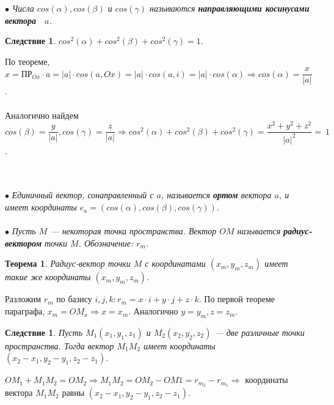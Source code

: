 $\bullet$ \textit{Числа $cos(\alpha), cos(\beta)$ и $cos(\gamma)$ называются \textbf{направляющими косинусами вектора~ $a$}.}
\newtheorem*{cor2_3_2}{Следствие}\begin{cor2_3_2}$cos^2(\alpha) + cos^2(\beta) + cos^2(\gamma) = 1.$
\end{cor2_3_2}\begin{Proof}
	По теореме, $x = \text{ПР}_{Ox}\cdot a = |a|\cdot cos(a, Ox) = |a|\cdot cos(a, i) = |a|\cdot cos(\alpha)\Rightarrow cos(\alpha) = \dfrac{x}{|a|}$.\\\\
	Аналогично найдем $cos(\beta) = \dfrac{y}{|a|}, cos(\gamma) = \dfrac{z}{|a|}\Rightarrow cos^2(\alpha) + cos^2(\beta) + cos^2(\gamma) = \dfrac{x^2 + y^2 + z^2}{|a|^2} =~ 1$.
\end{Proof}\\\\
$\bullet$ \textit{Единичный вектор, сонаправленный с $a$, называется \textbf{ортом} вектора $a$, и имеет
	координаты $e_a = (cos(\alpha), cos(\beta), cos(\gamma))$}.\\\\
$\bullet$ \textit{Пусть $M$ --- некоторая точка пространства. Вектор $OM$ называется \textbf{радиус-вектором} точки $M$.
	Обозначение: $r_m$.}
\newtheorem*{th2_3_2}{Теорема}\begin{th2_3_2}Радиус-вектор точки $M$ с координатами $(x_m, y_m, z_m)$ имеет такие же координаты $(x_m, y_m, z_m)$.
\end{th2_3_2}\begin{Proof}
	Разложим $r_m$ по базису $i, j, k: r_m = x\cdot i + y\cdot j + z\cdot k$. По первой теореме параграфа, $x_m = OM_x\Rightarrow x = x_m$. Аналогично $y = y_m, z = z_m$. 
\end{Proof}
\newtheorem*{cor2_3_3}{Следствие}\begin{cor2_3_3}Пусть $M_1(x_1, y_1, z_1)$ и $M_2(x_2, y_2, z_2)$ --- две различные точки пространства. Тогда вектор $M_1M_2$ имеет координаты $(x_2 - x_1, y_2 - y_1, z_2 - z_1)$.
\end{cor2_3_3}\begin{Proof}
	$OM_1 + M_1M_2 = OM_2\Rightarrow M_1 M_2 = OM_2 - OM1 = r_{m_2} - r_{m_1}\Rightarrow$ координаты вектора $M_1M_2$ равны $(x_2 - x_1, y_2 - y_1, z_2 - z_1)$.
\end{Proof}







